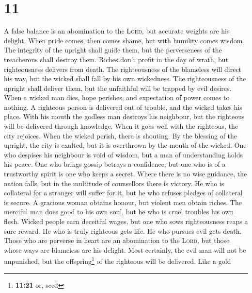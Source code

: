 \hypertarget{section-10}{%
\section{11}\label{section-10}}

 A false balance is an abomination to the \textsc{Lord},
but accurate weights are his delight.  When pride comes,
then comes shame, but with humility comes wisdom.  The
integrity of the upright shall guide them, but the perverseness of the
treacherous shall destroy them.  Riches don't profit in
the day of wrath, but righteousness delivers from death. 
The righteousness of the blameless will direct his way, but the wicked
shall fall by his own wickedness.  The righteousness of
the upright shall deliver them, but the unfaithful will be trapped by
evil desires.  When a wicked man dies, hope perishes, and
expectation of power comes to nothing.  A righteous person
is delivered out of trouble, and the wicked takes his place.
 With his mouth the godless man destroys his neighbour,
but the righteous will be delivered through knowledge. 
When it goes well with the righteous, the city rejoices. When the wicked
perish, there is shouting.  By the blessing of the
upright, the city is exalted, but it is overthrown by the mouth of the
wicked.  One who despises his neighbour is void of
wisdom, but a man of understanding holds his peace.  One
who brings gossip betrays a confidence, but one who is of a trustworthy
spirit is one who keeps a secret.  Where there is no wise
guidance, the nation falls, but in the multitude of counsellors there is
victory.  He who is collateral for a stranger will suffer
for it, but he who refuses pledges of collateral is secure.
 A gracious woman obtains honour, but violent men obtain
riches.  The merciful man does good to his own soul, but
he who is cruel troubles his own flesh.  Wicked people
earn deceitful wages, but one who sows righteousness reaps a sure
reward.  He who is truly righteous gets life. He who
pursues evil gets death.  Those who are perverse in heart
are an abomination to the \textsc{Lord}, but those whose ways are
blameless are his delight.  Most certainly, the evil man
will not be unpunished, but the offspring\footnote{\textbf{11:21} or,
  seed} of the righteous will be delivered.  Like a gold
